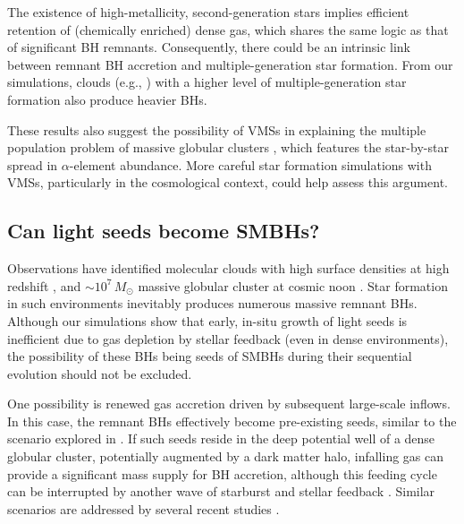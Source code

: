 \documentclass[twocolumn]{aastex631}
\begin{document}
The existence of high-metallicity, second-generation stars implies efficient retention of (chemically enriched) dense gas, which shares the same logic as that of significant BH remnants. Consequently, there could be an intrinsic link between remnant BH accretion and multiple-generation star formation. From our simulations, clouds (e.g., ) with a higher level of multiple-generation star formation also produce heavier BHs. 

These results also suggest the possibility of VMSs in explaining the multiple population problem of massive globular clusters \citep{BastianLardo_2018ARA&A..56...83B,MiloneMarino_2022Univ....8..359M}, which features the star-by-star spread in $\alpha$-element abundance. More careful star formation simulations with VMSs, particularly in the cosmological context, could help assess this argument.





\subsection{Can light seeds become SMBHs?}

Observations have identified molecular clouds with high surface densities at high redshift \citep{FujimotoOuchiKohno_2025NatAs...9.1553F}, and $\sim 10^7\,M_\odot$ massive globular cluster at cosmic noon \citep{PascaleDaiMcKee_2023ApJ...957...77P}. Star formation in such environments inevitably produces numerous massive remnant BHs. Although our simulations show that early, in-situ growth of light seeds is inefficient due to gas depletion by stellar feedback (even in dense environments), the possibility of these BHs being seeds of SMBHs during their sequential evolution should not be excluded.

One possibility is renewed gas accretion driven by subsequent large-scale inflows. In this case, the remnant BHs effectively become pre-existing seeds, similar to the scenario explored in \citet{ShiKremerHopkins_2024ApJ...969L..31S}. If such seeds reside in the deep potential well of a dense globular cluster, potentially augmented by a dark matter halo, infalling gas can provide a significant mass supply for BH accretion, although this feeding cycle can be interrupted by another wave of starburst and stellar feedback \citep{SunseriAndalmanTeyssier_2025arXiv251019822S}. Similar scenarios are addressed by several recent studies \citep{PartmannNaabLahen_2025MNRAS.537..956P,ReinosoLatifSchleicher_2025A&A...700A..66R,MukherjeeZhouChen_2025ApJ...981..203M}.
\end{document}
